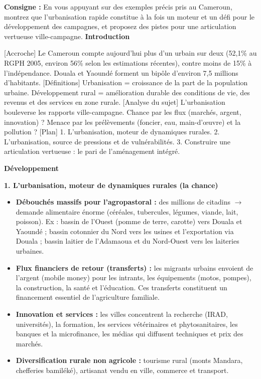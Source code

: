 \documentclass[11pt]{article}
\begin{document}
\begin{exoresolu}
\textbf{Consigne :} En vous appuyant sur des exemples précis pris au Cameroun, montrez que l'urbanisation rapide constitue à la fois un moteur et un défi pour le développement des campagnes, et proposez des pistes pour une articulation vertueuse ville-campagne.
\tcblower
\textbf{Introduction}

[Accroche] Le Cameroun compte aujourd'hui plus d'un urbain sur deux (52,1\% au RGPH 2005, environ 56\% selon les estimations récentes), contre moins de 15\% à l'indépendance. Douala et Yaoundé forment un bipôle d'environ 7,5 millions d'habitants.
[Définitions] Urbanisation = croissance de la part de la population urbaine. Développement rural = amélioration durable des conditions de vie, des revenus et des services en zone rurale.
[Analyse du sujet] L'urbanisation bouleverse les rapports ville-campagne. Chance par les flux (marchés, argent, innovation) ? Menace par les prélèvements (foncier, eau, main-d'œuvre) et la pollution ?
[Plan] 1. L'urbanisation, moteur de dynamiques rurales. 2. L'urbanisation, source de pressions et de vulnérabilités. 3. Construire une articulation vertueuse : le pari de l'aménagement intégré.

\textbf{Développement}

\textbf{1. L'urbanisation, moteur de dynamiques rurales (la chance)}
\begin{itemize}
    \item \textbf{Débouchés massifs pour l'agropastoral :} des millions de citadins $\rightarrow$ demande alimentaire énorme (céréales, tubercules, légumes, viande, lait, poisson). Ex : bassin de l'Ouest (pomme de terre, carotte) vers Douala et Yaoundé ; bassin cotonnier du Nord vers les usines et l'exportation via Douala ; bassin laitier de l'Adamaoua et du Nord-Ouest vers les laiteries urbaines.
    \item \textbf{Flux financiers de retour (transferts) :} les migrants urbains envoient de l'argent (mobile money) pour les intrants, les équipements (motos, pompes), la construction, la santé et l'éducation. Ces transferts constituent un financement essentiel de l'agriculture familiale.
    \item \textbf{Innovation et services :} les villes concentrent la recherche (IRAD, universités), la formation, les services vétérinaires et phytosanitaires, les banques et la microfinance, les médias qui diffusent techniques et prix des marchés.
    \item \textbf{Diversification rurale non agricole :} tourisme rural (monts Mandara, chefferies bamiléké), artisanat vendu en ville, commerce et transport.
\end{itemize}


\end{exoresolu}
\end{document}
